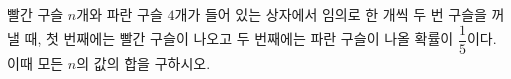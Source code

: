 빨간 구슬 $n$개와 파란 구슬 $4$개가 들어 있는 상자에서 임의로 한 개씩 두 번 구슬을 꺼낼 때, 첫 번째에는 빨간 구슬이 나오고 두 번째에는 파란 구슬이 나올 확률이 $\dfrac{1}{5}$이다. 이때 모든 $n$의 값의 합을 구하시오. 

